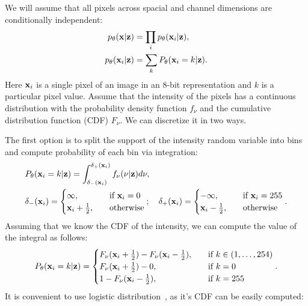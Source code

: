 We will assume that all pixels across spacial and channel dimensions are conditionally independent:
\begin{align}
    p_{\theta}({\mathbf{x}}|{\mathbf{z}}) &= \prod_i p_{\theta}({\mathbf{x}}_i|{\mathbf{z}}),\\
    p_{\theta}({\mathbf{x}}_i|{\mathbf{z}}) &= \sum_{k} P_{\theta}({\mathbf{x}}_i = k|{\mathbf{z}}).
\end{align}
Here ${\mathbf{x}}_i$ is a single pixel of an image in an 8-bit representation and $k$ is a particular pixel value. 
Assume that the intensity of the pixels has a continuous distribution with the probability density function $f_{\nu}$ and the cumulative distribution function (CDF) $F_{\nu}$. We can discretize it in two ways. 

The first option is to split the support of the intensity random variable into bins and compute probability of each bin via integration:
\begin{equation}\label{eq:intro_int_discr}
\begin{aligned}
    &P_{\theta}(\rvx_i = k|\rvz) = \int_{\delta_{-}(\rvx_i)}^{\delta_{+}(\rvx_i)} f_{\nu}(\nu|\rvz)d\nu,\\
    &\delta_{-}(\rvx_i) =
    \begin{cases}
        \infty,\quad &\text{if } \rvx_i = 0\\
        \rvx_i + \frac12,\quad&\text{otherwise}
    \end{cases};  \quad
    \delta_{+}(\rvx_i) =
    \begin{cases}
        -\infty,\quad &\text{if } \rvx_i = 255\\
        \rvx_i - \frac12,\quad&\text{otherwise}
    \end{cases}.
\end{aligned}
\end{equation}
Assuming that we know the CDF of the intensity, we can compute the value of the integral as follows:
\begin{equation}
    P_{\theta}({\mathbf{x}}_i = k|{\mathbf{z}}) =\begin{cases}
    F_{\nu}({\mathbf{x}}_i + \frac{1}{2}) - F_{\nu}({\mathbf{x}}_i - \frac{1}{2}),\quad &\text{if } k \in (1, \dots, 254) \\
    F_{\nu}({\mathbf{x}}_i + \frac{1}{2}) - 0,\quad &\text{if } k = 0 \\
    1 - F_{\nu}({\mathbf{x}}_i - \frac{1}{2}),\quad &\text{if } k = 255 \\
    \end{cases}.
\end{equation}
It is convenient to use logistic distribution~\cite{kingma2016improved}, as it's CDF can be easily computed:
